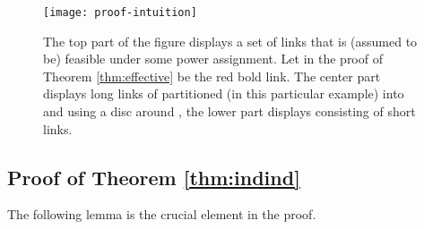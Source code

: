 \documentclass[11pt]{amsart}
\begin{document}
\begin{figure*}[ht]
	\begin{center}
		\texttt{[image: proof-intuition]}
	\end{center}
	\caption{The top part of the figure displays a set  of links that is (assumed to be) feasible under some power assignment. Let  in the proof of Theorem \ref{thm:effective} be the red bold link. The center part displays long links of  partitioned (in this particular example) into  and  using a disc around , the lower part displays  consisting of short links.}\label{fig:intuition}
\end{figure*}





\subsection{Proof of Theorem \ref{thm:indind}}

The following lemma is the crucial element in the proof.
\end{document}
